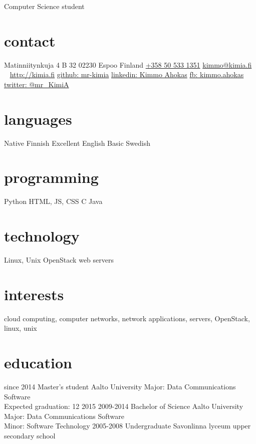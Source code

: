 \documentclass[]{friggeri-cv}
\begin{document}
       {Computer Science student}

\begin{aside}
  \section{contact}
    Matinniitynkuja 4 B 32
    02230 Espoo
    Finland
    \href{tel:+358505331351}{+358 50 533 1351}
    \href{mailto:kimmo@kimia.fi}{kimmo@kimia.fi}
    ~
    \href{http://kimia.fi}{http://kimia.fi}
    \href{https://github.com/mr-kimia}{github: mr-kimia}
    \href{https://www.linkedin.com/profile/view?id=230837792}{linkedin: Kimmo Ahokas}
    \href{https://www.facebook.com/kimmo.ahokas}{fb: kimmo.ahokas}
    \href{https://twitter.com/mr_KimiA}{twitter: @mr\_KimiA}
  \section{languages}
    Native Finnish
    Excellent English
    Basic Swedish
  \section{programming}
    Python
    HTML, JS, CSS
    C
    Java
  \section{technology}
    Linux, Unix
    OpenStack
    web servers
\end{aside}

\section{interests}

cloud computing, computer networks, network applications, servers, OpenStack,
linux, unix

\section{education}

\begin{entrylist}
  \entry
    {since 2014}
    {Master's student}
    {Aalto University}
    {Major: Data Communications Software\\
    Expected graduation: 12 2015}
  \entry
    {2009-2014}
    {Bachelor of Science}
    {Aalto University}
    {Major: Data Communications Software\\
    Minor: Software Technology}
  \entry
    {2005-2008}
    {Undergraduate}
    {Savonlinna lyceum upper secondary school}
    {}
\end{entrylist}
\end{document}
